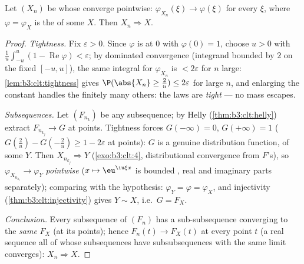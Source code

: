 \begin{theorem}
\label{thm:b3:clt:levy}
Let $(X_n)$ be  whose  converge pointwise: $\varphi_{X_n}(\xi) \to
\varphi(\xi)$ for every $\xi$, where $\varphi =
\varphi_X$ is the  of some  $X$. Then $X_n \Rightarrow X$.
\end{theorem}

\begin{proof}
\emph{Tightness.} Fix $\varepsilon > 0$. Since $\varphi$ is
 at $0$ with $\varphi(0) = 1$, choose $u > 0$ with
$\frac1u\int_{-u}^u(1 - \operatorname{Re}\varphi) <
\varepsilon$; by dominated convergence (integrand bounded by
$2$ on the fixed $[-u,u]$), the same integral for
$\varphi_{X_n}$ is $< 2\varepsilon$ for $n$ large:
\cref{lem:b3:clt:tightness} gives $\P(\abs{X_n} \geq \frac2u)
\leq 2\varepsilon$ for large $n$, and enlarging the constant
handles the finitely many others: the laws are \emph{tight}
--- no mass escapes.

\emph{Subsequences.} Let $(F_{n_k})$ be any subsequence; by
Helly (\cref{thm:b3:clt:helly}) extract $F_{n_{k_j}} \to G$
at  points. Tightness forces $G(-\infty) = 0$,
$G(+\infty) = 1$ ($G(\frac2u) - G(-\frac2u) \geq 1 -
2\varepsilon$ at  points): $G$ is a genuine
distribution function, of some  $Y$. Then
$X_{n_{k_j}} \Rightarrow Y$ (\cref{exo:b3:clt:4},
distributional convergence from $F$'s), so
$\varphi_{X_{n_{k_j}}} \to \varphi_Y$ \emph{pointwise} ($x
\mapsto \eu^{\iu\xi x}$ is bounded , real and
imaginary parts separately); comparing with the hypothesis:
$\varphi_Y = \varphi = \varphi_X$, and injectivity
(\cref{thm:b3:clt:injectivity}) gives $Y \sim X$, i.e.\ $G =
F_X$.

\emph{Conclusion.} Every subsequence of $(F_n)$ has a
sub-subsequence converging to the \emph{same} $F_X$ (at its
 points); hence $F_n(t) \to F_X(t)$ at every
 point $t$ (a real sequence all of whose
subsequences have subsubsequences with the same limit
converges): $X_n \Rightarrow X$.
\end{proof}


